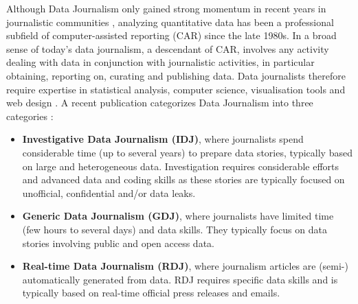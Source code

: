 \documentclass[runningheads,a4paper]{llncs}
\begin{document}
Although Data Journalism only gained strong momentum in recent years in journalistic communities  \cite{_Ref490834090} \cite{_Ref490834094}, analyzing quantitative data has been a professional subfield of computer-assisted reporting (CAR) since the late 1980s. In a broad sense of today's data journalism, a descendant of CAR, involves any activity dealing with data in conjunction with journalistic activities, in particular obtaining, reporting on, curating and publishing data. Data journalists therefore require expertise in statistical analysis, computer science, visualisation tools and web design  \cite{_Ref490834117}. A recent publication categorizes Data Journalism into three categories  \cite{_Ref490834129}: 
\begin{itemize}
\item {\bf Investigative Data Journalism (IDJ)}, where journalists spend considerable time (up to several years) to prepare data stories, typically based on large and heterogeneous data. Investigation requires considerable efforts and advanced data and coding skills as these stories are typically focused on unofficial, confidential and/or data leaks.
\item {\bf Generic Data Journalism (GDJ)}, where journalists have limited time (few hours to several days) and data skills. They typically focus on data stories involving public and open access data.
\item {\bf Real-time Data Journalism (RDJ)}, where journalism articles are (semi-) automatically generated from data. RDJ requires specific data skills and is typically based on real-time official press releases and emails.
\end{itemize}
\end{document}
